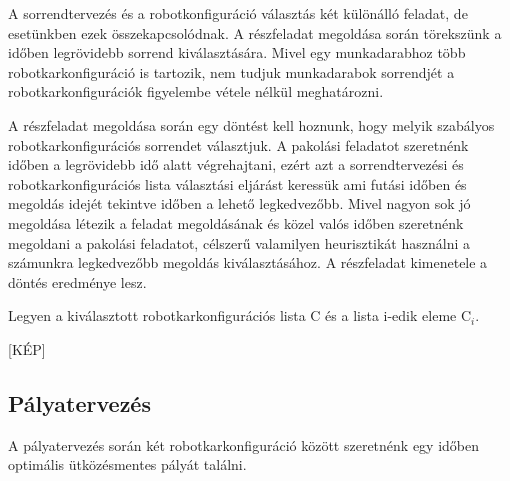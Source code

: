 A sorrendtervezés és a robotkonfiguráció választás két különálló feladat, de esetünkben ezek összekapcsolódnak. A részfeladat megoldása során törekszünk a időben legrövidebb sorrend kiválasztására. Mivel egy munkadarabhoz több robotkarkonfiguráció is tartozik, nem tudjuk munkadarabok sorrendjét a robotkarkonfigurációk figyelembe vétele nélkül meghatározni. 

A részfeladat megoldása során egy döntést kell hoznunk, hogy melyik szabályos robotkarkonfigurációs sorrendet választjuk.  
A pakolási feladatot szeretnénk időben a legrövidebb idő alatt végrehajtani, ezért azt a sorrendtervezési és robotkarkonfigurációs lista választási eljárást keressük ami futási időben és megoldás idejét tekintve időben a lehető legkedvezőbb.
Mivel nagyon sok jó megoldása létezik a feladat megoldásának és közel valós időben szeretnénk megoldani a pakolási feladatot, célszerű valamilyen heurisztikát használni a számunkra legkedvezőbb megoldás kiválasztásához. A részfeladat kimenetele a döntés eredménye lesz.
 



Legyen a kiválasztott robotkarkonfigurációs lista C és a lista i-edik eleme C$_i$.

[KÉP]


\subsection{Pályatervezés}
A pályatervezés során két robotkarkonfiguráció között szeretnénk egy időben optimális ütközésmentes pályát találni. 

